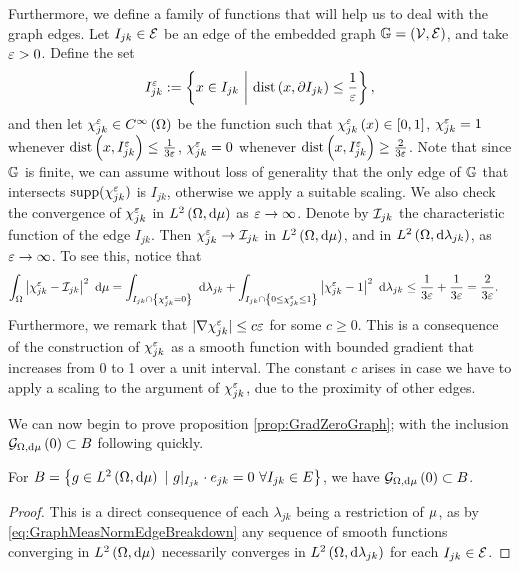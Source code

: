 Furthermore, we define a family of functions that will help us to deal with the graph edges.
Let $I_{jk}\in \mathcal{E}$ be an edge of the embedded graph $\mathbb{G}=\left( \mathcal{V},\mathcal{E} \right)$, and take $\varepsilon>0$.
Define the set 
\begin{align} \label{eq:ShortenedIntervalDef}
	I_{jk}^{\varepsilon} := \left\{  x\in I_{jk} \ \middle\vert \  \mathrm{dist}\left( x, \partial I_{jk} \right)\leq \frac{1}{\varepsilon} \right\},
\end{align}
and then let $\chi_{jk}^\varepsilon\in C^{\infty}\left( \Omega \right)$ be the function such that $\chi_{jk}^\varepsilon\left( x \right)\in [0,1]$, $\chi_{jk}^\varepsilon = 1$ whenever $\mathrm{dist}\left( x, I_{jk}^\varepsilon \right)\leq \frac{1}{3\varepsilon}$, $\chi_{jk}^\varepsilon = 0$ whenever $\mathrm{dist}\left( x, I_{jk}^\varepsilon \right)\geq \frac{2}{3\varepsilon}$.
Note that since $\mathbb{G}$ is finite, we can assume without loss of generality that the only edge of $\mathbb{G}$ that intersects $\mathrm{supp}(\chi_{jk}^\varepsilon)$ is $I_{jk}$, otherwise we apply a suitable scaling.
We also check the convergence of $\chi_{jk}^\varepsilon$ in $L^{2}\left( \Omega,\mathrm{d}\mu \right)$ as $\varepsilon\rightarrow\infty$.
Denote by $\mathcal{I}_{jk}$ the characteristic function of the edge $I_{jk}$.
Then $\chi_{jk}^\varepsilon \rightarrow \mathcal{I}_{jk}$ in $L^{2}\left( \Omega,\mathrm{d}\mu \right)$, and in $L^{2}\left( \Omega,\mathrm{d}\lambda_{jk} \right)$, as $\varepsilon\rightarrow\infty$.
To see this, notice that
\begin{align*}
	\int_{\Omega}\left\lvert  \chi_{jk}^\varepsilon - \mathcal{I}_{jk}  \right\rvert^2 \ \mathrm{d}\mu
	&= \int_{I_{jk}\cap\left\{ \chi_{jk}^\varepsilon = 0 \right\}} \ \mathrm{d}\lambda_{jk}
	+ \int_{I_{jk}\cap\left\{ 0\leq\chi_{jk}^\varepsilon \leq 1 \right\}}\left\lvert  \chi_{jk}^\varepsilon - 1  \right\rvert^2 \ \mathrm{d}\lambda_{jk}
	\leq \frac{1}{3\varepsilon} + \frac{1}{3\varepsilon} = \frac{2}{3\varepsilon}.
\end{align*}
Furthermore, we remark that $\lvert\nabla\chi_{jk}^\varepsilon\rvert \leq c\varepsilon$ for some $c\geq0$.
This is a consequence of the construction of $\chi_{jk}^\varepsilon$ as a smooth function with bounded gradient that increases from 0 to 1 over a unit interval.
The constant $c$ arises in case we have to apply a scaling to the argument of $\chi_{jk}^\varepsilon$, due to the proximity of other edges.

We can now begin to prove proposition \ref{prop:GradZeroGraph}; with the inclusion $\mathcal{G}_{ \Omega, \mathrm{d}\mu}\left( 0 \right) \subset B$ following quickly.
\begin{prop} \label{prop:Grad0IncB}
	For $B = \clbracs{g\in\ltwo{\ddom}{\ddmes} \ \vert \ g\vert_{I_{jk}}\cdot e_{jk}=0 \ \forall I_{jk}\in E}$, we have $\mathcal{G}_{ \Omega, \mathrm{d}\mu}\left( 0 \right) \subset B$.
\end{prop}
\begin{proof}
	This is a direct consequence of each $\lambda_{jk}$ being a restriction of $\mu$, as by \eqref{eq:GraphMeasNormEdgeBreakdown} any sequence of smooth functions converging in $L^{2}\left( \Omega,\mathrm{d}\mu \right)$ necessarily converges in $L^{2}\left( \Omega,\mathrm{d}\lambda_{jk} \right)$ for each $I_{jk}\in\mathcal{E}$.
\end{proof}

